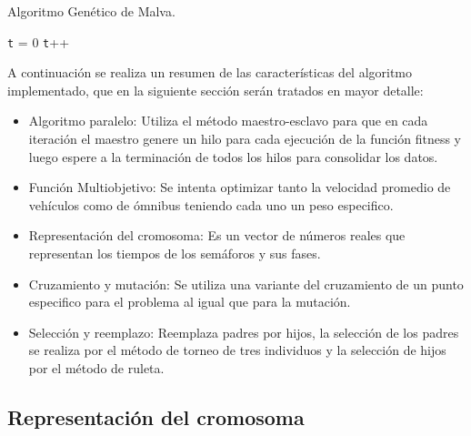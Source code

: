 \begin{algorithm}[H]
	\caption{Algoritmo Genético de Malva. }
	\label{alg:algoritmo_genetico_malva}
	\begin{algorithmic} [1] 
		{
			\STATE \texttt{t} = 0
			\STATE \texttt{t}++		
			\ENDWHILE
		}
	\end{algorithmic}
	
\end{algorithm}

A continuación se realiza un resumen de las características del algoritmo implementado, que en la siguiente sección serán tratados en mayor detalle:
\begin{itemize}

\item Algoritmo paralelo: Utiliza el método maestro-esclavo para que en cada iteración el maestro genere un hilo para cada ejecución  de la función fitness y luego espere a la terminación de todos los hilos para consolidar los datos. 
\item Función Multiobjetivo: Se intenta optimizar tanto la velocidad promedio de vehículos como de ómnibus teniendo cada uno un peso especifico.
\item Representación del cromosoma: Es un vector de números reales que representan los tiempos de los semáforos y sus fases.
\item Cruzamiento y mutación: Se utiliza una variante del cruzamiento de un punto especifico para el problema al igual que para la mutación.
\item Selección y reemplazo: Reemplaza padres por hijos, la selección de los padres se realiza por el método de torneo de tres individuos y la selección de hijos por el método de ruleta.

\end{itemize}

\subsection{Representación del cromosoma}

